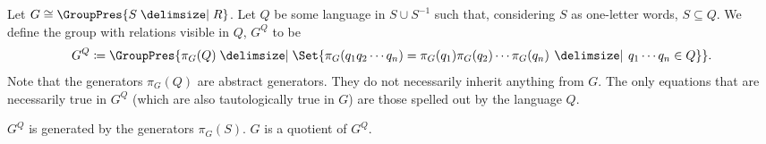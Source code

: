\begin{definition}
	Let $G \cong \GroupPres{S \relations R}$.
	Let  $Q$ be some language in  $S \cup S^{-1}$ such that, considering  $S$ as one-letter words, $S \subseteq Q$.
	We define the group with relations visible in $Q$,  $G^Q$ to be
	\[
		G^Q \coloneqq \GroupPres{\pi_G(Q) \relations \Set{\pi_G(q_1q_2\cdots q_n) = \pi_G(q_1)\pi_G(q_2) \cdots \pi_G(q_n) \given q_1\cdots q_n \in Q} }
		.\]
	Note that the generators $\pi_G(Q)$ are abstract generators.
	They do not necessarily inherit anything from $G$.
	The only equations that are necessarily true in  $G^Q$ (which are also tautologically true in $G$) are those spelled out by the language $Q$.
	\label{def:group_relations_visible_in_Q}
\end{definition}

\begin{remark}
	$G^Q$ is generated by the generators $\pi_G(S)$.
	$G$ is a quotient of  $G^Q$.
\end{remark}

